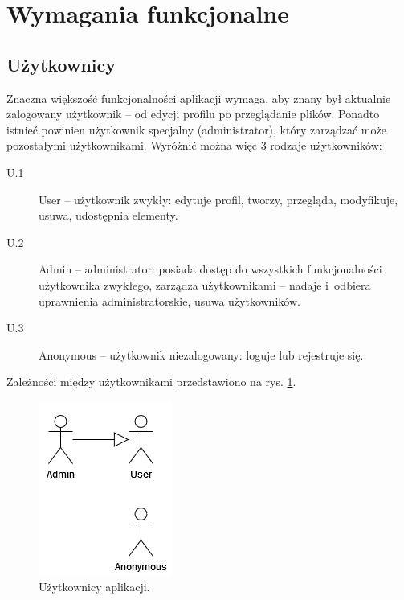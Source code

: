 \documentclass[a4paper,twoside,12pt]{book}
\begin{document}
\section{Wymagania funkcjonalne}

\subsection{Użytkownicy}
Znaczna większość funkcjonalności aplikacji wymaga, aby znany był aktualnie zalogowany użytkownik -- od edycji profilu po przeglądanie plików. Ponadto istnieć powinien użytkownik specjalny (administrator), który zarządzać może pozostałymi użytkownikami. Wyróżnić można więc 3 rodzaje użytkowników:
\begin{description}
	\item [U.1] User -- użytkownik zwykły: edytuje profil, tworzy, przegląda, modyfikuje, usuwa, udostępnia elementy.
	\item [U.2] Admin -- administrator: posiada dostęp do wszystkich funkcjonalności użytkownika zwykłego, zarządza użytkownikami -- nadaje i~odbiera uprawnienia administratorskie, usuwa użytkowników.
	\item [U.3] Anonymous -- użytkownik niezalogowany: loguje lub rejestruje się.
\end{description}	

Zależności między użytkownikami przedstawiono na rys. \ref{fig:uml-users}.

\begin{figure}
\centering
\includegraphics{./UML-Users.png}
\caption{Użytkownicy aplikacji.}
\label{fig:uml-users}
\end{figure}
\end{document}
